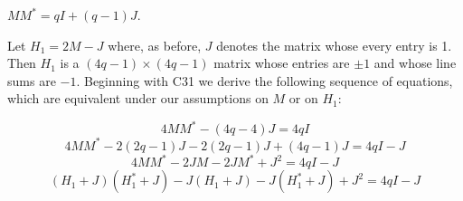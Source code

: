 $MM^* = qI + (q - 1)J$.

Let $H_1 = 2M - J$ where, as before, $J$ denotes the matrix whose every entry is 1. Then $H_1$ is a $(4q - 1) \times (4q - 1)$ matrix whose entries are $\pm 1$ and whose line sums are $-1$. Beginning with C31 we derive the following sequence of equations, which are equivalent under our assumptions on $M$ or on $H_1$:

$$4MM^* - (4q - 4)J = 4qI$$
$$4MM^* - 2(2q - 1)J - 2(2q - 1)J + (4q - 1)J = 4qI - J$$
$$4MM^* - 2JM - 2JM^* + J^2 = 4qI - J$$
$$(H_1 + J)(H_1^* + J) - J(H_1 + J) - J(H_1^* + J) + J^2 = 4qI - J$$
